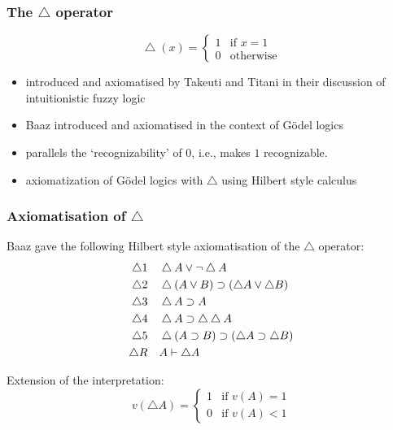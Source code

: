 \documentclass[aspectratio=169]%
  {beamer}
\newcommand{\cutin}[1]{%
\frame[c]{\begin{center}{\Large\bf\color{blue}#1}\end{center}}}
\def\mis{\\[\medskipamount]}
\def\axdelta{\mathnormal{\bd}}
\def\axdi{{\ensuremath{\axdelta1}}}
\def\axdii{{\ensuremath{\axdelta2}}}
\def\axdiii{{\ensuremath{\axdelta3}}}
\def\axdiv{{\ensuremath{\axdelta4}}}
\def\axdv{{\ensuremath{\axdelta5}}}
\def\axdr{{\ensuremath{\axdelta R}}}
\def\proves{\mathrel{\vdash}}
\newcommand\bd{\bigtriangleup} %
\newcommand{\I}{v}
\newcommand{\limp}{\supset}
\begin{document}



\begin{frame}
  \frametitle{The $\bd$ operator}
  \[ \mathop{\bd}(x) = \begin{cases} 1 & \text{if $x=1$}\\ 0 & \text{otherwise} \end{cases} \]

  \begin{itemize}
  \item introduced and axiomatised by Takeuti and Titani in their discussion
    of intuitionistic fuzzy logic\mis
  \item Baaz introduced and axiomatised in the context of Gödel logics\mis
  \item parallels the `recognizability' of $0$, i.e., makes $1$ recognizable.\mis
  \item axiomatization of Gödel logics with $\bd$ using Hilbert style
    calculus
  \end{itemize}
\end{frame}

\begin{frame}
  \frametitle{Axiomatisation of $\bd$}

  Baaz gave the following Hilbert style axiomatisation of the $\bd$ 
  operator:
  \begin{align*}
    \axdi &\quad \bd A\lor \lnot\bd A\\
    \axdii &\quad \bd (A\lor B) \limp (\bd A \lor \bd B)\\
    \axdiii&\quad \bd A \limp A\\
    \axdiv &\quad \bd A \limp \bd\bd A\\
    \axdv   &\quad \bd (A\limp B)\limp(\bd A\limp\bd B) \\
    \axdr & \quad A \proves \bd A
  \end{align*}
  
  Extension of the interpretation:
  \[
  \I(\bd A) = \begin{cases} 1 & \text{if\ } \I(A) = 1 \\
    0 & \text{if\ } \I(A) < 1
  \end{cases}
  \]
\end{frame}
\end{document}
